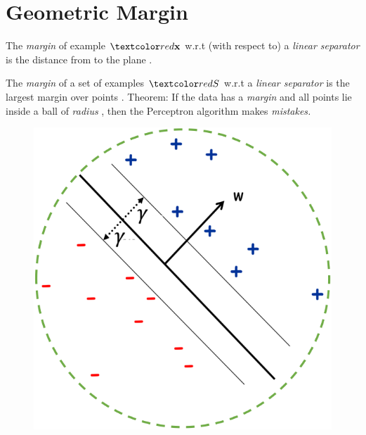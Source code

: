 \documentclass[
	number={2},
	title={Learning Linear Separators{,} SVMs and Kernels}
]{cs584notes}
\begin{document}
\section{Geometric Margin}\label{sec:geometric-margin}
\begin{minipage}[m]{0.72\textwidth}
	The \emph{margin} of example $\data{\vec{x}}$ w.r.t (with respect to) a \emph{linear separator}  is the distance from  to the plane .

	The \emph{margin} \data{$\gamma$} of a set of examples $\data{S}$ w.r.t a \emph{linear separator}  is the largest margin over points .
	Theorem: If the data has a \emph{margin} \data{$\gamma$} and all points lie inside a ball of \emph{radius} , then the Perceptron algorithm makes  \emph{mistakes.}
\end{minipage}\hfill%
\begin{minipage}[m]{0.25\textwidth}
	\begin{figure}[H]
		\centering
		\includegraphics[width=\textwidth]{figures/2/geometric_margin}
		\caption{}
		\label{fig:geometric-margin}
	\end{figure}
\end{minipage}
\end{document}

